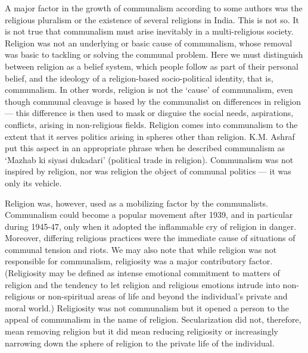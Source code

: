 A major factor in the growth of communalism according to some authors was the religious pluralism or the existence of several religions in India. This is not so. It is not true that communalism must arise inevitably in a multi-religious society. Religion was not an underlying or basic cause of communalism, whose removal was basic to tackling or solving the communal problem. Here we must distinguish between religion as a belief system, which people follow as part of their personal belief, and the ideology of a religion-based socio-political identity, that is, communalism. In other words, religion is not the `cause' of communalism, even though communal cleavage is based by the communalist on differences in religion — this difference is then used to mask or disguise the social needs, aspirations, conflicts, arising in non-religious fields. Religion comes into communalism to the extent that it serves politics arising in spheres other than religion. K.M. Ashraf put this aspect in an appropriate phrase when he described communalism as `Mazhab ki siyasi dukadari' (political trade in religion). Communalism was not inspired by religion, nor was religion the object of communal politics — it was only its vehicle. 

Religion was, however, used as a mobilizing factor by the communalists. Communalism could become a popular movement after 1939, and in particular during 1945-47, only when it adopted the inflammable cry of religion in danger. Moreover, differing religious practices were the immediate cause of situations of communal tension and riots. We may also note that while religion was not responsible for communalism, religiosity was a major contributory factor. (Religiosity may be defined as intense emotional commitment to matters of religion and the tendency to let religion and religious emotions intrude into non-religious or non-spiritual areas of life and beyond the individual's private and moral world.) Religiosity was not communalism but it opened a person to the appeal of communalism in the name of religion. Secularization did not, therefore, mean removing religion but it did mean reducing religiosity or increasingly narrowing down the sphere of religion to the private life of the individual.
